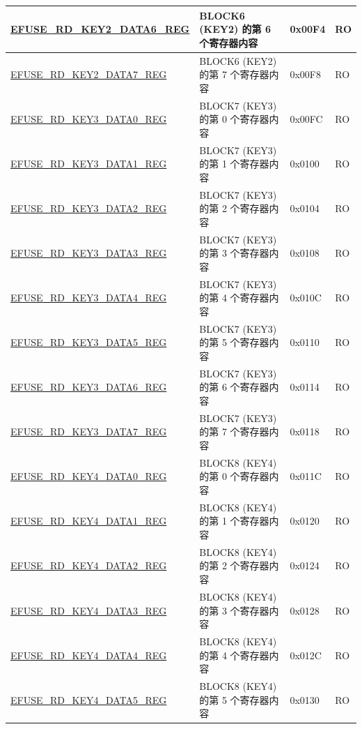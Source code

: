 \begin{longtable}{ | p{6cm} | p{7.2cm} | p{1.3cm} | p{1cm} | }
\hyperref[regdesc:EFUSERDKEY2DATA6REG]{EFUSE\_RD\_KEY2\_DATA6\_REG} & BLOCK6 (KEY2) 的第 6 个寄存器内容  & 0x00F4 & RO \\ \hline
\hyperref[regdesc:EFUSERDKEY2DATA7REG]{EFUSE\_RD\_KEY2\_DATA7\_REG} & BLOCK6 (KEY2) 的第 7 个寄存器内容  & 0x00F8 & RO \\ \hline
\hyperref[regdesc:EFUSERDKEY3DATA0REG]{EFUSE\_RD\_KEY3\_DATA0\_REG} & BLOCK7 (KEY3) 的第 0 个寄存器内容  & 0x00FC & RO \\ \hline
\hyperref[regdesc:EFUSERDKEY3DATA1REG]{EFUSE\_RD\_KEY3\_DATA1\_REG} & BLOCK7 (KEY3) 的第 1 个寄存器内容  & 0x0100 & RO \\ \hline
\hyperref[regdesc:EFUSERDKEY3DATA2REG]{EFUSE\_RD\_KEY3\_DATA2\_REG} & BLOCK7 (KEY3) 的第 2 个寄存器内容  & 0x0104 & RO \\ \hline
\hyperref[regdesc:EFUSERDKEY3DATA3REG]{EFUSE\_RD\_KEY3\_DATA3\_REG} & BLOCK7 (KEY3) 的第 3 个寄存器内容  & 0x0108 & RO \\ \hline
\hyperref[regdesc:EFUSERDKEY3DATA4REG]{EFUSE\_RD\_KEY3\_DATA4\_REG} & BLOCK7 (KEY3) 的第 4 个寄存器内容  & 0x010C & RO \\ \hline
\hyperref[regdesc:EFUSERDKEY3DATA5REG]{EFUSE\_RD\_KEY3\_DATA5\_REG} & BLOCK7 (KEY3) 的第 5 个寄存器内容  & 0x0110 & RO \\ \hline
\hyperref[regdesc:EFUSERDKEY3DATA6REG]{EFUSE\_RD\_KEY3\_DATA6\_REG} & BLOCK7 (KEY3) 的第 6 个寄存器内容  & 0x0114 & RO \\ \hline
\hyperref[regdesc:EFUSERDKEY3DATA7REG]{EFUSE\_RD\_KEY3\_DATA7\_REG} & BLOCK7 (KEY3) 的第 7 个寄存器内容  & 0x0118 & RO \\ \hline
\hyperref[regdesc:EFUSERDKEY4DATA0REG]{EFUSE\_RD\_KEY4\_DATA0\_REG} & BLOCK8 (KEY4) 的第 0 个寄存器内容  & 0x011C & RO \\ \hline
\hyperref[regdesc:EFUSERDKEY4DATA1REG]{EFUSE\_RD\_KEY4\_DATA1\_REG} & BLOCK8 (KEY4) 的第 1 个寄存器内容  & 0x0120 & RO \\ \hline
\hyperref[regdesc:EFUSERDKEY4DATA2REG]{EFUSE\_RD\_KEY4\_DATA2\_REG} & BLOCK8 (KEY4) 的第 2 个寄存器内容  & 0x0124 & RO \\ \hline
\hyperref[regdesc:EFUSERDKEY4DATA3REG]{EFUSE\_RD\_KEY4\_DATA3\_REG} & BLOCK8 (KEY4) 的第 3 个寄存器内容  & 0x0128 & RO \\ \hline
\hyperref[regdesc:EFUSERDKEY4DATA4REG]{EFUSE\_RD\_KEY4\_DATA4\_REG} & BLOCK8 (KEY4) 的第 4 个寄存器内容  & 0x012C & RO \\ \hline
\hyperref[regdesc:EFUSERDKEY4DATA5REG]{EFUSE\_RD\_KEY4\_DATA5\_REG} & BLOCK8 (KEY4) 的第 5 个寄存器内容  & 0x0130 & RO \\ \hline

\end{longtable}
